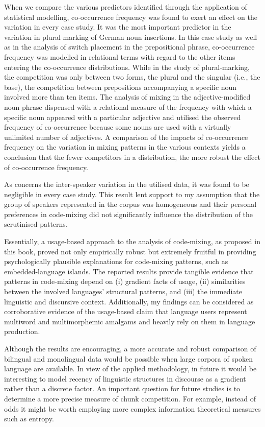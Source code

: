 When we compare the various predictors identified through the application of statistical modelling, co-occurrence frequency was found to exert an effect on the variation in every case study. It was the most important predictor in the variation in plural marking of German noun insertions. In this case study as well as in the analysis of switch placement in the prepositional phrase, co-occurrence frequency was modelled in relational terms with regard to the other items entering the co-occurrence distributions. While in the study of plural-marking, the competition was only between two forms, the plural and the singular (i.e., the base), the competition between prepositions accompanying a specific noun involved more than ten items. The analysis of mixing in the adjective-modified noun phrase dispensed with a relational measure of the frequency with which a specific noun appeared with a particular adjective and utilised the observed frequency of co-occurrence because some nouns are used with a virtually unlimited number of adjectives. A comparison of the impacts of co-occurrence frequency on the variation in mixing patterns in the various contexts yields a conclusion that the fewer competitors in a distribution, the more robust the effect of co-occurrence frequency.

As concerns the inter-speaker variation in the utilised data, it was found to be negligible in every case study. This result lent support to my assumption that the group of speakers represented in the corpus was homogeneous and their personal preferences in code-mixing did not significantly influence the distribution of the scrutinised patterns. 

Essentially, a usage-based approach to the analysis of code-mixing, as proposed in this book, proved not only empirically robust but extremely fruitful in providing psychologically plausible explanations for code-mixing patterns, such as embedded-language islands. The reported results provide tangible evidence that patterns in code-mixing depend on (i) gradient facts of usage, (ii) similarities between the involved languages’ structural patterns, and (iii) the immediate linguistic and discursive context. Additionally, my findings can be considered as corroborative evidence of the usage-based claim that language users represent multiword and multimorphemic amalgams and heavily rely on them in language production.

Although the results are encouraging, a more accurate and robust comparison of bilingual and monolingual data would be possible when large corpora of spoken language are available. In view of the applied methodology, in future it would be interesting to model recency of linguistic structures in discourse as a gradient rather than a discrete factor. An important question for future studies is to determine a more precise measure of chunk competition. For example, instead of odds it might be worth employing more complex information theoretical measures such as entropy. 

